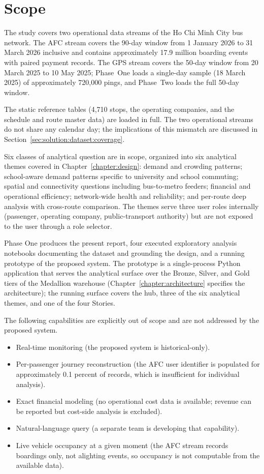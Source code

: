 \section{Scope}
\label{sec:intro:scope}

The study covers two operational data streams of the Ho Chi Minh City
bus network. The AFC stream covers the 90-day window from 1 January
2026 to 31 March 2026 inclusive and contains approximately 17.9
million boarding events with paired payment records. The GPS stream
covers the 50-day window from 20 March 2025 to 10 May 2025; Phase~One
loads a single-day sample (18 March 2025) of approximately 720,000
pings, and Phase~Two loads the full 50-day window.

The static reference tables (4,710 stops, the operating companies, and
the schedule and route master data) are loaded in full. The two
operational streams do not share any calendar day; the implications of
this mismatch are discussed in
Section~\ref{sec:solution:dataset:coverage}.

Six classes of analytical question are in scope, organized into six
analytical themes covered in Chapter~\ref{chapter:design}: demand
and crowding patterns; school-aware demand patterns specific to
university and school commuting; spatial and connectivity questions
including bus-to-metro feeders; financial and operational efficiency;
network-wide health and reliability; and per-route deep analysis with
cross-route comparison. The themes serve three user roles internally
(passenger, operating company, public-transport authority) but are not
exposed to the user through a role selector.

Phase One produces the present report, four executed exploratory
analysis notebooks documenting the dataset and grounding the design,
and a running prototype of the proposed system. The prototype is a
single-process Python application that serves the analytical surface
over the Bronze, Silver, and Gold tiers of the Medallion warehouse
(Chapter~\ref{chapter:architecture} specifies the architecture); the
running surface covers the hub, three of the six analytical themes,
and one of the four Stories.

The following capabilities are explicitly out of scope and are not
addressed by the proposed system.

\begin{itemize}
\item Real-time monitoring (the proposed system is historical-only).
\item Per-passenger journey reconstruction (the AFC user identifier
is populated for approximately 0.1 percent of records, which is
insufficient for individual analysis).
\item Exact financial modeling (no operational cost data is
available; revenue can be reported but cost-side analysis is
excluded).
\item Natural-language query (a separate team is developing that
capability).
\item Live vehicle occupancy at a given moment (the AFC stream
records boardings only, not alighting events, so occupancy is not
computable from the available data).
\end{itemize}
